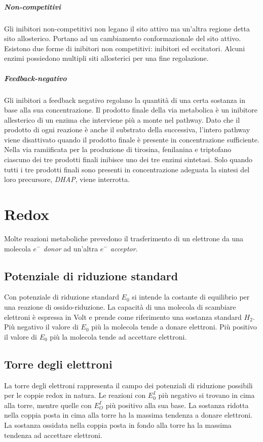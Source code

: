 				\subparagraph{Non-competitivi}
				Gli inibitori non-competitivi non legano il sito attivo ma un'altra regione detta sito allosterico.
				Portano ad un cambiamento conformazionale del sito attivo. 
				Esistono due forme di inibitori non competitivi: inibitori ed eccitatori.
				Alcuni enzimi possiedono multipli siti allosterici per una fine regolazione.

				\subparagraph{Feedback-negativo}
				Gli inibitori a feedback negativo regolano la quantit\`a di una certa sostanza in base alla sua concentrazione.
				Il prodotto finale della via metabolica \`e un inibitore allesterico di un enzima che interviene pi\`u a monte nel pathway. 
				Dato che il prodotto di ogni reazione \`e anche il substrato della successiva, l'intero pathway viene disattivato quando il prodotto finale \`e presente in concentrazione sufficiente. 
				Nella via ramiificata per la produzione di tirosina, fenilanina e triptofano ciascuno dei tre prodotti finali inibisce uno dei tre enzimi sintetasi. 
				Solo quando tutti i tre prodotti finali sono presenti in concentrazione adeguata la sintesi del loro precursore, \emph{DHAP}, viene interrotta. 
 
\section{Redox}
Molte reazioni metaboliche prevedono il trasferimento di un elettrone da una molecola \emph{$e^{-}$ donor} ad un'altra \emph{$e^{-}$ acceptor}.

	\subsection{Potenziale di riduzione standard}
	Con potenziale di riduzione standard $E_0$ si intende la costante di equilibrio per una reazione di ossido-riduzione.
	La capacit\`a di una molecola di scambiare elettroni \`e espressa in Volt e prende come riferimento una sostanza standard \emph{$H_2$}.
	Pi\`u negativo il valore di $E_0$ pi\`u la molecola tende a donare elettroni.
	Pi\`u positivo il valore di $E_0$ pi\`u la molecola tende ad accettare elettroni.

	\subsection{Torre degli elettroni}
	La torre degli elettroni rappresenta il campo dei potenziali di riduzione possibili per le coppie redox in natura.
	Le reazioni con $E^{I}_0$ pi\`u negativo si trovano in cima alla torre, mentre quelle con $E^{I}_O$ pi\`u positivo alla sua base.
	La sostanza ridotta nella coppia posta in cima alla torre ha la massima tendenza a donare elettroni.
	La sostanza ossidata nella coppia posta in fondo alla torre ha la massima tendenza ad accettare elettroni.

